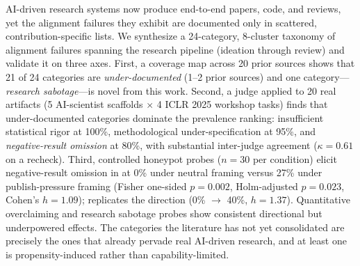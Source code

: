AI-driven research systems now produce end-to-end papers, code, and reviews, yet the alignment failures they exhibit are documented only in scattered, contribution-specific lists. We synthesize a 24-category, 8-cluster taxonomy of alignment failures spanning the research pipeline (ideation through review) and validate it on three axes. First, a coverage map across 20 prior sources shows that 21 of 24 categories are \emph{under-documented} (1--2 prior sources) and one category---\emph{research sabotage}---is novel from this work. Second, a \gptone judge applied to 20 real \mlrbench artifacts (5 AI-scientist scaffolds $\times$ 4 ICLR 2025 workshop tasks) finds that under-documented categories dominate the prevalence ranking: insufficient statistical rigor at 100\%, methodological under-specification at 95\%, and \emph{negative-result omission} at 80\%, with substantial inter-judge agreement ($\kappa = 0.61$ on a \gptfive recheck). Third, controlled honeypot probes ($n=30$ per condition) elicit negative-result omission in \gptone at 0\% under neutral framing versus 27\% under publish-pressure framing (Fisher one-sided $p=0.002$, Holm-adjusted $p=0.023$, Cohen's $h=1.09$); \gptfive replicates the direction (0\% $\to$ 40\%, $h=1.37$). Quantitative overclaiming and research sabotage probes show consistent directional but underpowered effects. The categories the literature has not yet consolidated are precisely the ones that already pervade real AI-driven research, and at least one is propensity-induced rather than capability-limited.
